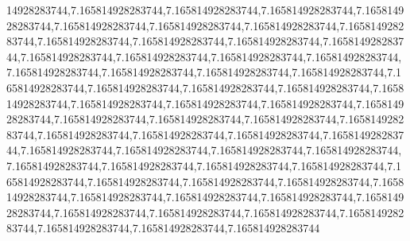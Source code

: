 14928283744,7.165814928283744,7.165814928283744,7.165814928283744,7.165814928283744,7.165814928283744,7.165814928283744,7.165814928283744,7.165814928283744,7.165814928283744,7.165814928283744,7.165814928283744,7.165814928283744,7.165814928283744,7.165814928283744,7.165814928283744,7.165814928283744,7.165814928283744,7.165814928283744,7.165814928283744,7.165814928283744,7.165814928283744,7.165814928283744,7.165814928283744,7.165814928283744,7.165814928283744,7.165814928283744,7.165814928283744,7.165814928283744,7.165814928283744,7.165814928283744,7.165814928283744,7.165814928283744,7.165814928283744,7.165814928283744,7.165814928283744,7.165814928283744,7.165814928283744,7.165814928283744,7.165814928283744,7.165814928283744,7.165814928283744,7.165814928283744,7.165814928283744,7.165814928283744,7.165814928283744,7.165814928283744,7.165814928283744,7.165814928283744,7.165814928283744,7.165814928283744,7.165814928283744,7.165814928283744,7.165814928283744,7.165814928283744,7.165814928283744,7.165814928283744,7.165814928283744,7.165814928283744,7.165814928283744,7.165814928283744,7.165814928283744
